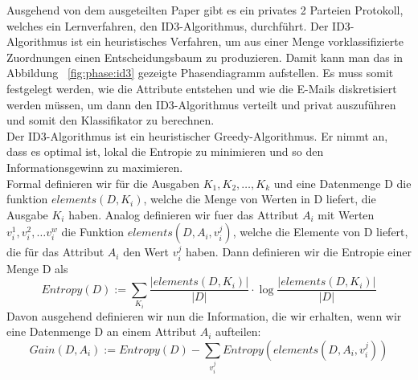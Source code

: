 \documentclass{article}
\theoremstyle{definition}
\theoremstyle{remark}
\begin{document}
Ausgehend von dem ausgeteilten Paper gibt es ein privates 2 Parteien Protokoll,
welches ein Lernverfahren, den ID3-Algorithmus, durchf\"uhrt. Der ID3-Algorithmus
ist ein heuristisches Verfahren, um aus einer Menge vorklassifizierte Zuordnungen
einen Entscheidungsbaum zu produzieren. Damit kann man das in Abbildung ~\ref{fig:phase:id3}
gezeigte Phasendiagramm aufstellen. Es muss somit festgelegt werden, wie die 
Attribute entstehen und wie die E-Mails diskretisiert werden m\"ussen, um dann den
ID3-Algorithmus verteilt und privat auszuf\"uhren und somit den Klassifikator zu
berechnen.\\
Der ID3-Algorithmus ist ein heuristischer Greedy-Algorithmus. Er nimmt an, dass
es optimal ist, lokal die Entropie zu minimieren und so den Informationsgewinn
zu maximieren. \\
Formal definieren wir f\"ur die Ausgaben \(K_1, K_2, \dots, K_k\) und eine
Datenmenge D die funktion \(elements(D, K_i)\), welche die Menge von Werten in D
liefert, die Ausgabe \(K_i\) haben. Analog definieren wir fuer das Attribut
\(A_i\) mit Werten \(v^1_i, v^2_i, \dots v^w_i\) die Funktion 
\(elements(D, A_i, v^j_i)\), welche die Elemente von D liefert, die f\"ur das 
Attribut \(A_i\) den Wert \(v^j_i\) haben. Dann definieren wir die 
Entropie einer Menge D als\\
\begin{equation}
  Entropy(D) := \sum_{K_i} \frac{|elements(D,K_i)|}{|D|} 
\cdot 
  \log \frac{|elements(D,K_i)|}{|D|}
\end{equation}
Davon ausgehend definieren wir nun die Information, die wir erhalten, wenn wir
eine Datenmenge D an einem Attribut \(A_i\) aufteilen:
\begin{equation}
Gain(D, A_i) :=
 Entropy(D) - \sum_{v^j_i} Entropy(elements(D, A_i, v^j_i))
\end{equation}
\end{document}
